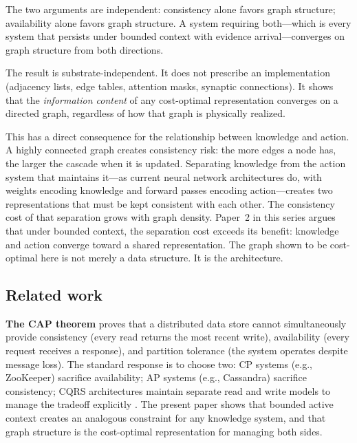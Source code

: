 \documentclass[11pt]{article}
\theoremstyle{definition}
\begin{document}
The two arguments are independent: consistency alone favors graph
structure; availability alone favors graph structure. A system
requiring both---which is every system that persists under bounded
context with evidence arrival---converges on graph structure from
both directions.

The result is substrate-independent. It does not prescribe an
implementation (adjacency lists, edge tables, attention masks, synaptic
connections). It shows that the \emph{information content} of any
cost-optimal representation converges on a directed graph, regardless of how that
graph is physically realized.

This has a direct consequence for the relationship between knowledge
and action. A highly connected graph creates consistency risk:
the more edges a node has, the larger the cascade when it is
updated. Separating knowledge from the action system that maintains
it---as current neural network architectures do, with weights
encoding knowledge and forward passes encoding action---creates two
representations that must be kept consistent with each other.
The consistency cost of that separation grows with graph density.
Paper~2 in this series \cite{McCarthy2026b} argues that under
bounded context, the separation cost exceeds its benefit: knowledge
and action converge toward a shared representation. The graph shown
to be cost-optimal here is not merely a data structure. It is the
architecture.

\subsection{Related work}

\textbf{The CAP theorem} \cite{Brewer2000, Gilbert2002} proves that a
distributed data store cannot simultaneously provide consistency
(every read returns the most recent write), availability (every
request receives a response), and partition tolerance (the system
operates despite message loss). The standard response is to choose
two: CP systems (e.g., ZooKeeper) sacrifice availability; AP systems
(e.g., Cassandra) sacrifice consistency; CQRS architectures maintain
separate read and write models to manage the tradeoff explicitly
\cite{Young2010}. The present paper shows that bounded active context
creates an analogous constraint for any knowledge system, and that
graph structure is the cost-optimal representation for managing both sides.
\end{document}

